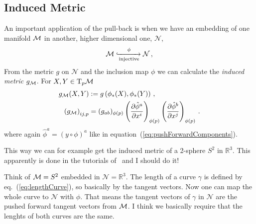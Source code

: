 \subsection{Induced Metric}
An important application of the pull-back is when we have an embedding
of one manifold $\mathcal{M}$ in another, higher dimensional one, $\mathcal{N}$,
\begin{equation}
    \mathcal{M} \xhookrightarrow[\text{injective}]{\phi} \mathcal{N}\,,
\end{equation}
From the metric $g$ on $\mathcal{N}$ and the inclusion map $\phi$ we can calculate
the \textit{induced metric} $g_{\mathcal{M}}$.
For $X,Y\in\T_p \M$
\begin{align}
    g_{\mathcal{M}}(X,Y) &:= g\left( \phi_*(X), \phi_*(Y) \right)\,,\\
    \left( g_{\mathcal{M}} \right)_{ij,p} &= (g_{ab})_{\phi(p)}\left( \frac{\partial \hat{\phi}^a}{\partial x^i} \right)_{\phi(p)}
    \left( \frac{\partial \hat{\phi}^b}{\partial x^j} \right)_{\phi(p)}\,.
\end{align}
where again $\hat{\phi}^a = (y\circ\phi)^a$ like in equation~(\ref{eq:pushForwardComponents}).
\begin{note}
    This way we can for example get the induced metric of a 2-sphere $S^2$ in
    $\mathbb{R}^3$.
    This apparently is done in the tutorials of~\cite{Schuller15} and I should do it!
\end{note}
\begin{note}
    Think of $\mathcal{M}=S^2$ embedded in $\mathcal{N} = \mathbb{R}^3$.
    The length of a curve $\gamma$ is defined by eq.~(\ref{eq:lengthCurve}), 
    so basically by the tangent vectors.
    Now one can map the whole curve to $\mathcal{N}$ with $\phi$.
    That means the tangent vectors of $\gamma$ in $\mathcal{N}$ are the 
    pushed forward tangent vectors from $\mathcal{M}$.
    I think we basically require that the lenghts of both curves are the same.
\end{note}
